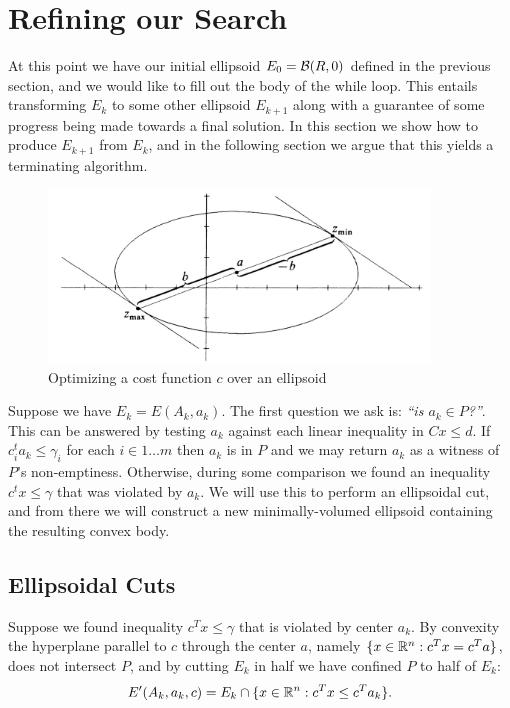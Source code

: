 
\section{Refining our Search}
At this point we have our initial ellipsoid \(E_0 = \mathcal{B}(R, 0)\) defined in the
previous section, and we would like to fill out the body of the while loop. This
entails transforming \(E_k\) to some other ellipsoid \(E_{k+1}\) along with a
guarantee of some progress being made towards a final solution. In this section
we show how to produce \(E_{k+1}\) from \(E_k\), and in the following section we
argue that this yields a terminating algorithm.\\

\begin{figure}[h]
  \centering
  \includegraphics[width=0.9\textwidth]{img/ellipsoid-opt}
  \caption{Optimizing a cost function \(c\) over an ellipsoid}
  \label{fig:ellipsoid-opt}
\end{figure}
Suppose we have \(E_k = E(A_k, a_k)\). The first question we ask is:
\textit{``is \(a_k \in P\)?''}. This can be answered by testing \(a_k\) against
each linear inequality in \(Cx \leq d\). If \(c_i^t a_k \leq \gamma_i\) for each
\(i \in 1 \ldots m\) then \(a_k\) is in \(P\) and we may return \(a_k\) as a
witness of \(P\)'s non-emptiness. Otherwise, during some comparison we found an
inequality \(c^tx \leq \gamma\) that was violated by \(a_k\). We will use this
to perform an ellipsoidal cut, and from there we will construct a new
minimally-volumed ellipsoid containing the resulting convex body.\\


\subsection{Ellipsoidal Cuts}
Suppose we found inequality \(c^Tx \leq \gamma\) that is violated by center
\(a_k\). By convexity the hyperplane parallel to \(c\) through the center \(a\),
namely \(\{x \in \mathbb R^n : c^T x = c^T a\}\), does not intersect \(P\), and by
cutting \(E_k\) in half we have confined \(P\) to half of \(E_k\):
%
\begin{equation}\label{eq:ellipsoid-cut}
  E'(A_k, a_k, c) = E_k \cap \{ x \in \mathbb R^n : c^T x \leq c^T a_k\}.
\end{equation}

